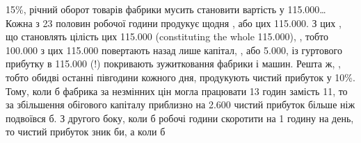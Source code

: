 \parcont{}  %
15\%, річний оборот товарів фабрики мусить становити вартість у \num{115.000}\dots{} Кожна з
23 половин робочої години продукує щодня , або  цих \num{115.000}. З цих ,
що становлять цілість цих \num{115.000} (constituting the whole \num{115.000}), , тобто
\num{100.000} з цих \num{115.000} повертають назад лише капітал, , або \num{5.000}, із гуртового прибутку в \num{115.000} (!) покривають зужитковання фабрики і машин. Решта ж,
, тобто обидві останні півгодини кожного дня, продукують чистий прибуток
у 10\%. Тому, коли б фабрика за незмінних цін могла працювати 13 годин замість 11, то за
збільшення обігового
капіталу приблизно на \num{2.600} чистий прибуток більше ніж подвоївся б. З другого
боку, коли б робочі години скоротити на 1 годину на день, то чистий прибуток зник би, а коли б
